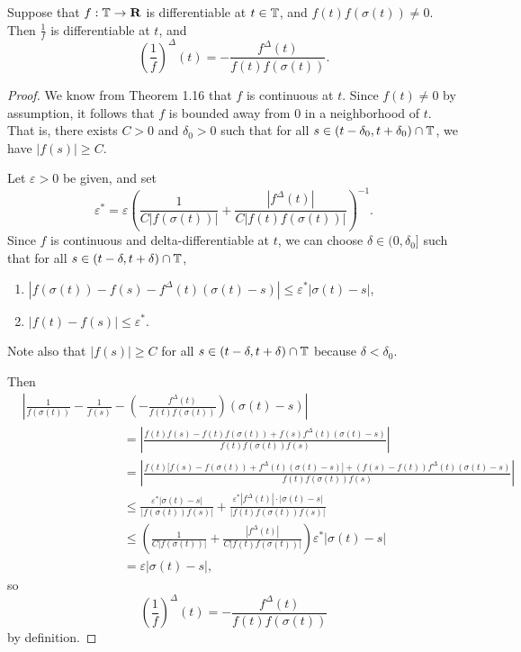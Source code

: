 \documentclass[nonumber]{homework}
\begin{document}
	Suppose that $f : \mathbb{T} \to \textnormal{\bf R}$ is differentiable at $t \in \mathbb{T}$, and $f(t)f(\sigma(t)) \ne 0$. Then $\frac{1}{f}$ is differentiable at $t$, and
	\begin{equation*}
		\left(\frac{1}{f}\right)^\Delta(t) = -\frac{f^\Delta(t)}{f(t)f(\sigma(t))}.
	\end{equation*}
	\begin{proof}
		We know from Theorem 1.16 that $f$ is continuous at $t$. Since $f(t) \ne 0$ by assumption, it follows that $f$ is bounded away from 0 in a neighborhood of $t$. That is, there exists $C > 0$ and $\delta_0 > 0$ such that for all $s \in (t-\delta_0, t+\delta_0)\cap \mathbb{T}$, we have $|f(s)| \ge C$.
		
		Let $\varepsilon > 0$ be given, and set 
		\begin{equation*}
			\varepsilon^*= \varepsilon\left(\frac{1}{C|f(\sigma(t))|} + \frac{\left|f^\Delta(t)\right|}{C\big|f(t)f(\sigma(t))\big|}\right)^{-1}.
		\end{equation*}
		Since $f$ is continuous and delta-differentiable at $t$, we can choose $\delta  \in (0, \delta_0]$ such that for all $s \in (t-\delta, t+\delta) \cap \mathbb{T}$,
		\begin{enumerate}
			\item $|f(\sigma(t)) - f(s) - f^\Delta(t)(\sigma(t) - s)| \le \varepsilon^* |\sigma(t) - s|$,
			\item $|f(t) - f(s)| \le \varepsilon^*$.
		\end{enumerate}
		Note also that $|f(s)| \ge C$ for all $s \in (t-\delta, t+\delta)\cap\mathbb{T}$ because $\delta < \delta_0$.
		
		Then
		\begin{align*}
			&\left|\frac{1}{f(\sigma(t))} - \frac{1}{f(s)} - \left(-\frac{f^\Delta(t)}{f(t)f(\sigma(t))}\right)(\sigma(t) - s)\right|\\[0.5em]
			&\qquad\qquad\qquad\qquad= \left|\frac{f(t)f(s) - f(t)f(\sigma(t)) + f(s)f^\Delta(t)(\sigma(t)-s)}{f(t)f(\sigma(t))f(s)}\right| \\[0.5em]
			&\qquad\qquad\qquad\qquad= \left|\frac{f(t)\big[f(s) - f(\sigma(t)) + f^\Delta(t)(\sigma(t)-s)\big] + (f(s) - f(t))f^\Delta(t)(\sigma(t) - s)}{f(t)f(\sigma(t))f(s)}\right| \\[0.5em]
			&\qquad\qquad\qquad\qquad \le \frac{\varepsilon^*|\sigma(t)-s|}{\big|f(\sigma(t))f(s)|} + \frac{\varepsilon^*\left|f^\Delta(t)\right|\cdot|\sigma(t)-s|}{\big|f(t)f(\sigma(t))f(s)\big|} \\[0.5em]
			&\qquad\qquad\qquad\qquad \le \left(\frac{1}{C|f(\sigma(t))|} + \frac{\left|f^\Delta(t)\right|}{C\big|f(t)f(\sigma(t))\big|}\right)\varepsilon^*|\sigma(t)-s| \\[0.5em]
			&\qquad\qquad\qquad\qquad = \varepsilon|\sigma(t)-s|,
		\end{align*}
		so
		\begin{equation*}
			\left(\frac{1}{f}\right)^\Delta(t) = -\frac{f^\Delta(t)}{f(t)f(\sigma(t))}
		\end{equation*}
		by definition.
	\end{proof}
	
\end{document}
